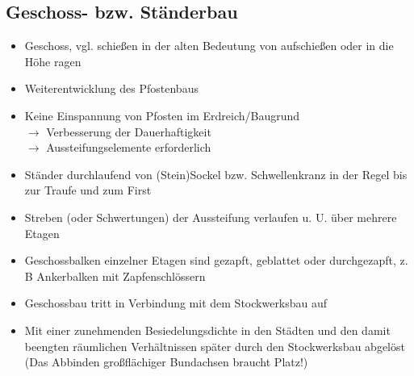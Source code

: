 \documentclass[fleqn,twoside]{article}
\begin{document}
\subsection{Geschoss- bzw. Ständerbau}
    \begin{minipage}{0.6\textwidth}
    \begin{itemize}
        \item Geschoss, vgl. schießen in der alten Bedeutung von aufschießen oder in die Höhe ragen
        \item Weiterentwicklung des Pfostenbaus
        \item Keine Einspannung von Pfosten im Erdreich/Baugrund\\
        $\rightarrow$ Verbesserung der Dauerhaftigkeit\\
        $\rightarrow$ Aussteifungselemente erforderlich
        \item Ständer durchlaufend von (Stein)Sockel bzw. Schwellenkranz in der Regel bis zur Traufe und zum
        First
        \item Streben (oder Schwertungen) der Aussteifung verlaufen u. U. über mehrere Etagen
        \item Geschossbalken einzelner Etagen sind gezapft, geblattet oder durchgezapft, z. B Ankerbalken mit
        Zapfenschlössern
        \item Geschossbau tritt in Verbindung mit dem Stockwerksbau auf
        \item Mit einer zunehmenden Besiedelungsdichte in den Städten und den damit beengten räumlichen
        Verhältnissen später durch den Stockwerksbau abgelöst (Das Abbinden großflächiger Bundachsen
        braucht Platz!)
    \end{itemize}
    \end{minipage}
\end{document}
